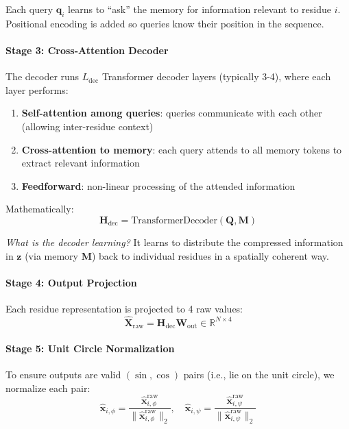 \documentclass[12pt,a4paper]{article}
\begin{document}
Each query $\mathbf{q}_i$ learns to ``ask'' the memory for information relevant to residue $i$. Positional encoding is added so queries know their position in the sequence.

\paragraph{Stage 3: Cross-Attention Decoder}
The decoder runs $L_{\text{dec}}$ Transformer decoder layers (typically 3-4), where each layer performs:
\begin{enumerate}
    \item \textbf{Self-attention among queries}: queries communicate with each other (allowing inter-residue context)
    \item \textbf{Cross-attention to memory}: each query attends to all memory tokens to extract relevant information
    \item \textbf{Feedforward}: non-linear processing of the attended information
\end{enumerate}

Mathematically:
\begin{equation}
\mathbf{H}_{\text{dec}} = \text{TransformerDecoder}(\mathbf{Q}, \mathbf{M})
\end{equation}

\textit{What is the decoder learning?} It learns to distribute the compressed information in $\mathbf{z}$ (via memory $\mathbf{M}$) back to individual residues in a spatially coherent way.

\paragraph{Stage 4: Output Projection}
Each residue representation is projected to 4 raw values:
\begin{equation}
\hat{\mathbf{X}}_{\text{raw}} = \mathbf{H}_{\text{dec}} \mathbf{W}_{\text{out}} \in \mathbb{R}^{N \times 4}
\end{equation}

\paragraph{Stage 5: Unit Circle Normalization}
To ensure outputs are valid $(\sin, \cos)$ pairs (i.e., lie on the unit circle), we normalize each pair:
\begin{equation}
\hat{\mathbf{x}}_{i,\phi} = \frac{\hat{\mathbf{x}}_{i,\phi}^{\text{raw}}}{\|\hat{\mathbf{x}}_{i,\phi}^{\text{raw}}\|_2}, \quad
\hat{\mathbf{x}}_{i,\psi} = \frac{\hat{\mathbf{x}}_{i,\psi}^{\text{raw}}}{\|\hat{\mathbf{x}}_{i,\psi}^{\text{raw}}\|_2}
\end{equation}
\end{document}
